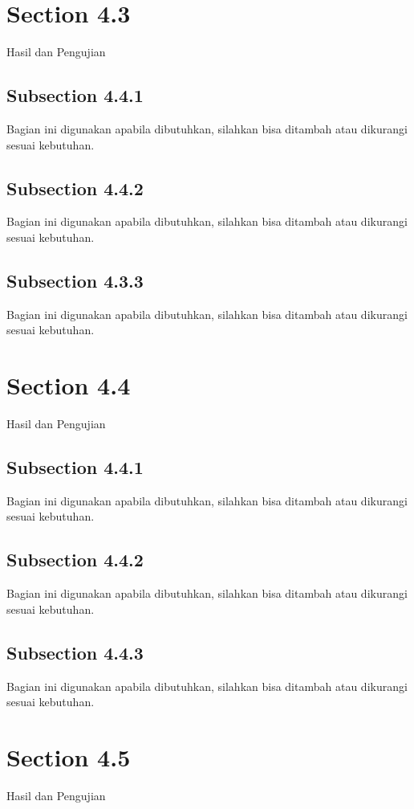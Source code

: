 \section{Section 4.3}
Hasil dan Pengujian

\subsection{Subsection 4.4.1}
Bagian ini digunakan apabila dibutuhkan, silahkan bisa ditambah atau dikurangi sesuai kebutuhan.

\subsection{Subsection 4.4.2}
Bagian ini digunakan apabila dibutuhkan, silahkan bisa ditambah atau dikurangi sesuai kebutuhan.

\subsection{Subsection 4.3.3}
Bagian ini digunakan apabila dibutuhkan, silahkan bisa ditambah atau dikurangi sesuai kebutuhan.

\section{Section 4.4}
Hasil dan Pengujian

\subsection{Subsection 4.4.1}
Bagian ini digunakan apabila dibutuhkan, silahkan bisa ditambah atau dikurangi sesuai kebutuhan.

\subsection{Subsection 4.4.2}
Bagian ini digunakan apabila dibutuhkan, silahkan bisa ditambah atau dikurangi sesuai kebutuhan.

\subsection{Subsection 4.4.3}
Bagian ini digunakan apabila dibutuhkan, silahkan bisa ditambah atau dikurangi sesuai kebutuhan.

\section{Section 4.5}
Hasil dan Pengujian

